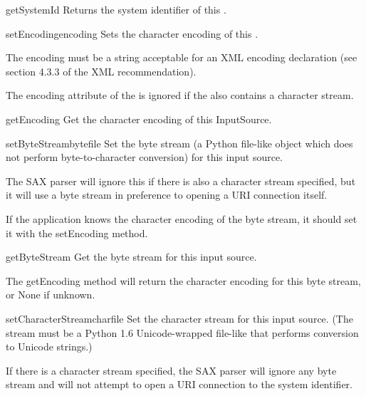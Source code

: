 \begin{methoddesc}[InputSource]{getSystemId}{}
  Returns the system identifier of this .
\end{methoddesc}

\begin{methoddesc}[InputSource]{setEncoding}{encoding}
  Sets the character encoding of this .

  The encoding must be a string acceptable for an XML encoding
  declaration (see section 4.3.3 of the XML recommendation).
 
  The encoding attribute of the  is ignored if the
   also contains a character stream.
\end{methoddesc}

\begin{methoddesc}[InputSource]{getEncoding}{}
  Get the character encoding of this InputSource.
\end{methoddesc}

\begin{methoddesc}[InputSource]{setByteStream}{bytefile}
  Set the byte stream (a Python file-like object which does not
  perform byte-to-character conversion) for this input source.
  
  The SAX parser will ignore this if there is also a character stream
  specified, but it will use a byte stream in preference to opening a
  URI connection itself.
  
  If the application knows the character encoding of the byte stream,
  it should set it with the setEncoding method.
\end{methoddesc}

\begin{methoddesc}[InputSource]{getByteStream}{}
  Get the byte stream for this input source.
        
  The getEncoding method will return the character encoding for this
  byte stream, or None if unknown.
\end{methoddesc}

\begin{methoddesc}[InputSource]{setCharacterStream}{charfile}
  Set the character stream for this input source. (The stream must be
  a Python 1.6 Unicode-wrapped file-like that performs conversion to
  Unicode strings.)
  
  If there is a character stream specified, the SAX parser will ignore
  any byte stream and will not attempt to open a URI connection to the
  system identifier.
\end{methoddesc}

